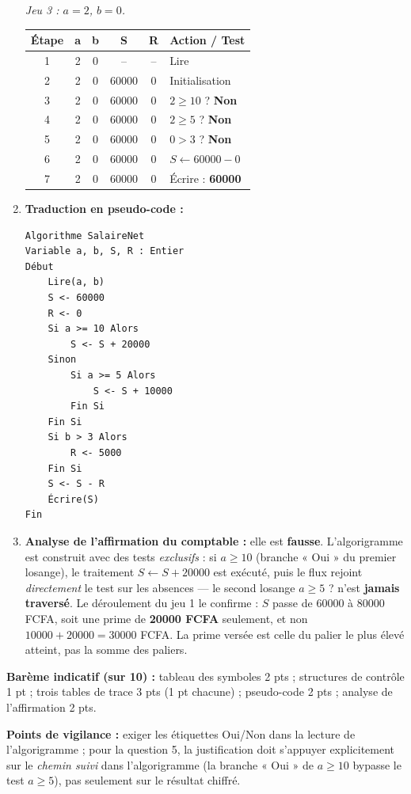 \documentclass[11pt]{article}
\begin{document}
\begin{corrige}
\begin{enumerate}
\emph{Jeu 3 : $a = 2$, $b = 0$.}
\begin{center}
\begin{tabularx}{\linewidth}{|c|c|c|c|c|X|}
\hline
\rowcolor{popblueL} \textbf{Étape} & \textbf{a} & \textbf{b} & \textbf{S} & \textbf{R} & \textbf{Action / Test} \\
\hline
1 & 2 & 0 & -- & -- & Lire \\
2 & 2 & 0 & 60000 & 0 & Initialisation \\
3 & 2 & 0 & 60000 & 0 & $2 \geq 10$ ? \textbf{Non} \\
4 & 2 & 0 & 60000 & 0 & $2 \geq 5$ ? \textbf{Non} \\
5 & 2 & 0 & 60000 & 0 & $0 > 3$ ? \textbf{Non} \\
6 & 2 & 0 & 60000 & 0 & $S \leftarrow 60000 - 0$ \\
7 & 2 & 0 & 60000 & 0 & Écrire : \textbf{60000} \\
\hline
\end{tabularx}
\end{center}
\item \textbf{Traduction en pseudo-code :}
\begin{lstlisting}
Algorithme SalaireNet
Variable a, b, S, R : Entier
Début
    Lire(a, b)
    S <- 60000
    R <- 0
    Si a >= 10 Alors
        S <- S + 20000
    Sinon
        Si a >= 5 Alors
            S <- S + 10000
        Fin Si
    Fin Si
    Si b > 3 Alors
        R <- 5000
    Fin Si
    S <- S - R
    Écrire(S)
Fin
\end{lstlisting}
\item \textbf{Analyse de l'affirmation du comptable :} elle est \textbf{fausse}. L'algorigramme est construit avec des tests \emph{exclusifs} : si $a \geq 10$ (branche « Oui » du premier losange), le traitement $S \leftarrow S + 20000$ est exécuté, puis le flux rejoint \emph{directement} le test sur les absences — le second losange $a \geq 5$ ? n'est \textbf{jamais traversé}. Le déroulement du jeu 1 le confirme : $S$ passe de \num{60000} à \num{80000} FCFA, soit une prime de \textbf{\num{20000} FCFA} seulement, et non $10000 + 20000 = \num{30000}$ FCFA. La prime versée est celle du palier le plus élevé atteint, pas la somme des paliers.
\end{enumerate}
\textbf{Barème indicatif (sur 10) :} tableau des symboles 2 pts ; structures de contrôle 1 pt ; trois tables de trace 3 pts (1 pt chacune) ; pseudo-code 2 pts ; analyse de l'affirmation 2 pts.

\textbf{Points de vigilance :} exiger les étiquettes Oui/Non dans la lecture de l'algorigramme ; pour la question 5, la justification doit s'appuyer explicitement sur le \emph{chemin suivi} dans l'algorigramme (la branche « Oui » de $a \geq 10$ bypasse le test $a \geq 5$), pas seulement sur le résultat chiffré.
\end{corrige}
\end{document}
